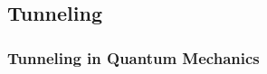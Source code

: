     
    

\subsection{Tunneling}
\label{sect:tunneling}

    \subsubsection{Tunneling in Quantum Mechanics}
    
